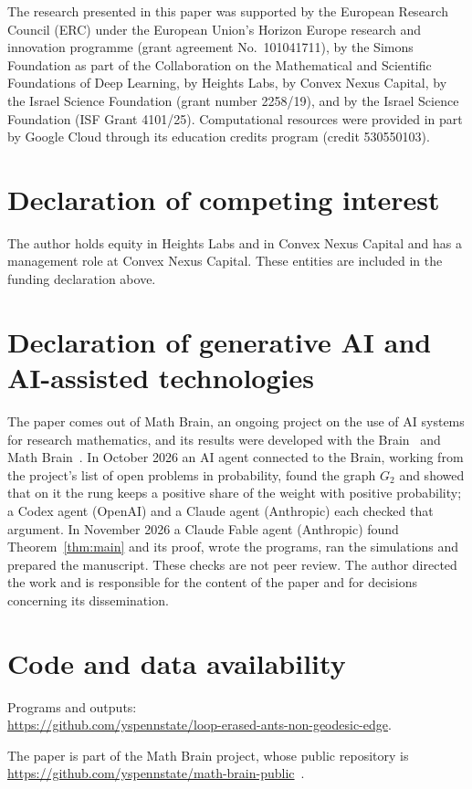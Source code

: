 \documentclass[11pt]{amsart}
\theoremstyle{remark}
\begin{document}
The research presented in this paper was supported by the European Research Council (ERC) under the European Union's
Horizon Europe research and innovation programme (grant agreement No.~101041711), by the Simons Foundation as part of
the Collaboration on the Mathematical and Scientific Foundations of Deep Learning, by Heights Labs, by Convex Nexus
Capital, by the Israel Science Foundation (grant number 2258/19), and by the Israel Science Foundation (ISF Grant
4101/25). Computational resources were provided in part by Google Cloud through its education credits program (credit
530550103).

\section*{Declaration of competing interest}
The author holds equity in Heights Labs and in Convex Nexus Capital and has a management role at Convex Nexus Capital.
These entities are included in the funding declaration above.

\section*{Declaration of generative AI and AI-assisted technologies}
The paper comes out of Math Brain, an ongoing project on the use of AI systems for research mathematics, and its
results were developed with the Brain~\cite{BrainFramework} and Math Brain~\cite{MathBrainRepo}. In October 2026 an AI
agent connected to the Brain, working from the project's list of open problems in probability, found the graph $G_2$
and showed that on it the rung keeps a positive share of the weight with positive probability; a Codex agent (OpenAI)
and a Claude agent (Anthropic) each checked that argument. In November 2026 a Claude Fable agent (Anthropic) found
Theorem~\ref{thm:main} and its proof, wrote the programs, ran the simulations and prepared the manuscript. These
checks are not peer review. The author directed the work and is responsible for the content of the paper and for
decisions concerning its dissemination.

\section*{Code and data availability}
Programs and outputs:\\
\url{https://github.com/yspennstate/loop-erased-ants-non-geodesic-edge}.

The paper is part of the Math Brain project, whose public repository is
\url{https://github.com/yspennstate/math-brain-public}~\cite{MathBrainRepo}.
\end{document}
